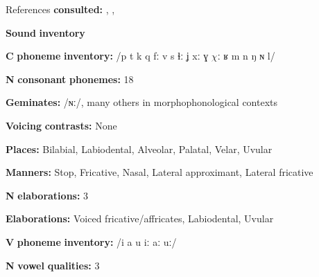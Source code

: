 \documentclass[output=paper]{langsci/langscibook}
\begin{document}
\begin{styleBody}
References \textbf{consulted:} \citet{Fortescue1984}, \citet{Hagerup2011}, \citet{Jacobsen2000}
\end{styleBody}

\begin{styleBody}
\textbf{Sound} \textbf{inventory}
\end{styleBody}

\begin{styleBody}
\textbf{C} \textbf{phoneme} \textbf{inventory:} /p t k q fː v s ɬː ʝ xː ɣ $\chi ː$ ʁ m n ŋ ɴ l/
\end{styleBody}

\begin{styleBody}
\textbf{N} \textbf{consonant} \textbf{phonemes:} 18
\end{styleBody}

\begin{styleBody}
\textbf{Geminates:} /ɴː/, many others in morphophonological contexts
\end{styleBody}

\begin{styleBody}
\textbf{Voicing} \textbf{contrasts:} None
\end{styleBody}

\begin{styleBody}
\textbf{Places:} Bilabial, Labiodental, Alveolar, Palatal, Velar, Uvular
\end{styleBody}

\begin{styleBody}
\textbf{Manners:} Stop, Fricative, Nasal, Lateral approximant, Lateral fricative 
\end{styleBody}

\begin{styleBody}
\textbf{N} \textbf{elaborations:} 3
\end{styleBody}

\begin{styleBody}
\textbf{Elaborations:} Voiced fricative/affricates, Labiodental, Uvular
\end{styleBody}

\begin{styleBody}
\textbf{V} \textbf{phoneme} \textbf{inventory:} /i a u iː aː uː/
\end{styleBody}

\begin{styleBody}
\textbf{N} \textbf{vowel} \textbf{qualities:} 3
\end{styleBody}
\end{document}
